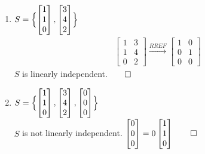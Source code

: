 \documentclass[12pt, a4paper]{article}
\begin{document}
\begin{enumerate}[Q\arabic*.]
\begin{enumerate}[(\alph*)]
      \item $S = \Bigl\{\begin{bmatrix}1\\1\\0\end{bmatrix}, \begin{bmatrix}3\\4\\2\end{bmatrix}\Bigr\}$ 
      \begin{align*}
        \begin{bmatrix}
          1 & 3\\
          1 & 4\\
          0 & 2
        \end{bmatrix}\xrightarrow{RREF}
        \begin{bmatrix}
          1 & 0\\
          0 & 1\\
          0 & 0
        \end{bmatrix}
      \end{align*}
      $S$ is linearly independent.$\qed$


      \item $S = \Bigl\{\begin{bmatrix}1\\1\\0\end{bmatrix}, \begin{bmatrix}3\\4\\2\end{bmatrix}, \begin{bmatrix}0\\0\\0\end{bmatrix}\Bigr\}$\\ 
        $S$ is not linearly independent. $\begin{bmatrix}0\\0\\0\end{bmatrix} = 0\begin{bmatrix}1\\1\\0\end{bmatrix}\qed$
      

\end{enumerate}
\end{enumerate}
\end{document}

